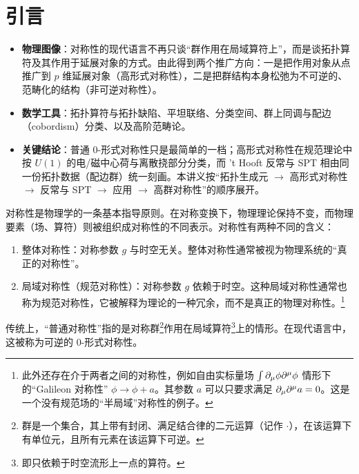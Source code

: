 
\section{引言}

\begin{keytakeaways}
  \begin{itemize}[leftmargin=1.4em,itemsep=2pt,topsep=2pt]
    \item \textbf{物理图像}：对称性的现代语言不再只谈“群作用在局域算符上”，而是谈拓扑算符及其作用于延展对象的方式。由此得到两个推广方向：一是把作用对象从点推广到 $p$ 维延展对象（高形式对称性），二是把群结构本身松弛为不可逆的、范畴化的结构（非可逆对称性）。
    \item \textbf{数学工具}：拓扑算符与拓扑缺陷、平坦联络、分类空间、群上同调与配边（cobordism）分类、以及高阶范畴论。
    \item \textbf{关键结论}：普通 $0$-形式对称性只是最简单的一档；高形式对称性在规范理论中按 $U(1)$ 的电/磁中心荷与离散挠部分分类，而 't Hooft 反常与 SPT 相由同一份拓扑数据（配边群）统一刻画。本讲义按“拓扑生成元 $\to$ 高形式对称性 $\to$ 反常与 SPT $\to$ 应用 $\to$ 高群对称性”的顺序展开。
  \end{itemize}
\end{keytakeaways}

对称性是物理学的一条基本指导原则。在对称变换下，物理理论保持不变，而物理要素（场、算符）则被组织成对称性的不同表示。对称性有两种不同的含义：
\begin{enumerate}
  \item 整体对称性：对称参数 $g$ 与时空无关。整体对称性通常被视为物理系统的“真正的对称性”。
  \item 局域对称性（规范对称性）：对称参数 $g$ 依赖于时空。这种局域对称性通常也称为规范对称性，它被解释为理论的一种冗余，而不是真正的物理对称性。\footnote{此外还存在介于两者之间的对称性，例如自由实标量场 $\int \partial_\mu\phi\partial^\mu\phi$ 情形下的“Galileon 对称性”\cite{Nicolis:2008in,Hinterbichler:2015pqa} $\phi\rightarrow\phi+a$。其参数 $a$ 可以只要求满足 $\partial_\mu\partial^\mu a=0$。这是一个没有规范场的“半局域”对称性的例子。}
\end{enumerate}

传统上，“普通对称性”指的是对称群\footnote{群是一个集合，其上带有封闭、满足结合律的二元运算（记作 $\cdot$），在该运算下有单位元，且所有元素在该运算下可逆。}作用在局域算符\footnote{即只依赖于时空流形上一点的算符。}上的情形。在现代语言中，这被称为可逆的 $0$-形式对称性。

